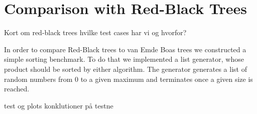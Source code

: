\section*{Comparison with Red-Black Trees}
Kort om red-black trees
hvilke test cases har vi og hvorfor?

In order to compare Red-Black trees to van Emde Boas trees we constructed a simple sorting benchmark.
To do that we implemented a list generator, whose product should be sorted by either algorithm.
The generator generates a list of random numbers from 0 to a given maximum and terminates once a given size is reached.

test og plots
konklutioner på testne